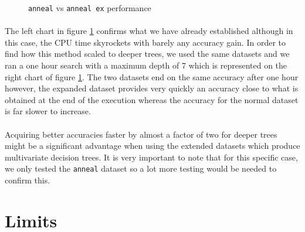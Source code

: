 \documentclass[12pt]{report}
\theoremstyle{definition}
\theoremstyle{definition}
\theoremstyle{definition}
\begin{document}
\begin{figure}[ht]
\begin{center}
    \end{center}
    \caption{\texttt{anneal} vs \texttt{anneal ex} performance}
    \label{fig:annealperf}
\end{figure}

\paragraph{} The left chart in figure \ref{fig:annealperf} confirms what we have already established although in this
case, the CPU time skyrockets with barely any accuracy gain. In order to find how this method scaled to deeper trees,
we used the same datasets and we ran a one hour search with a maximum depth of 7 which is represented on the right chart
of figure \ref{fig:annealperf}. The two datasets end on the same accuracy after one hour however, the expanded dataset
provides very quickly an accuracy close to what is obtained at the end of the execution whereas the accuracy for the
normal dataset is far slower to increase.

\paragraph{} Acquiring better accuracies faster by almost a factor of two for deeper trees might be a significant
advantage when using the extended datasets which produce multivariate decision trees. It is very important to note
that for this specific case, we only tested the \texttt{anneal} dataset so a lot more testing would be needed to confirm
this.

\newpage

\section{Limits}
\end{document}
